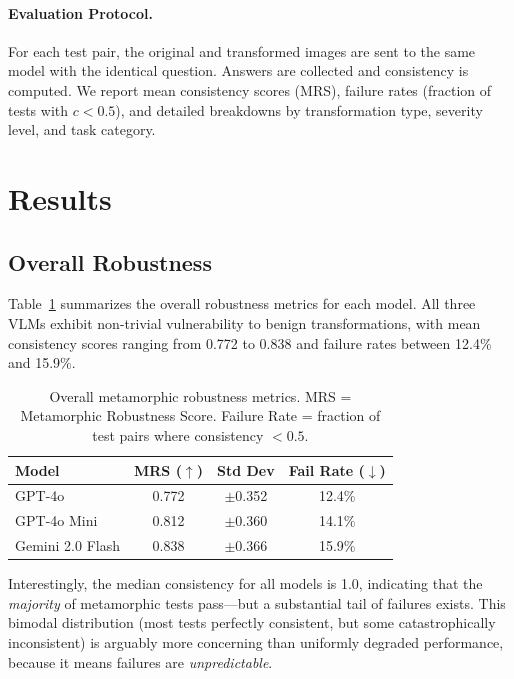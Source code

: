\documentclass[10pt,twocolumn,letterpaper]{article}
\begin{document}
\paragraph{Evaluation Protocol.} For each test pair, the original and transformed images are sent to the same model with the identical question. Answers are collected and consistency is computed. We report mean consistency scores (MRS), failure rates (fraction of tests with $c < 0.5$), and detailed breakdowns by transformation type, severity level, and task category.

\section{Results}
\label{sec:results}

\subsection{Overall Robustness}

Table~\ref{tab:overall} summarizes the overall robustness metrics for each model. All three VLMs exhibit non-trivial vulnerability to benign transformations, with mean consistency scores ranging from 0.772 to 0.838 and failure rates between 12.4\% and 15.9\%.

\begin{table}[t]
\centering
\caption{Overall metamorphic robustness metrics. MRS = Metamorphic Robustness Score. Failure Rate = fraction of test pairs where consistency $< 0.5$.}
\label{tab:overall}
\begin{tabular}{lccc}
\toprule
\textbf{Model} & \textbf{MRS} ($\uparrow$) & \textbf{Std Dev} & \textbf{Fail Rate} ($\downarrow$) \\
\midrule
GPT-4o & 0.772 & $\pm$0.352 & 12.4\% \\
GPT-4o Mini & 0.812 & $\pm$0.360 & 14.1\% \\
Gemini 2.0 Flash & 0.838 & $\pm$0.366 & 15.9\% \\
\bottomrule
\end{tabular}
\end{table}

Interestingly, the median consistency for all models is 1.0, indicating that the \emph{majority} of metamorphic tests pass---but a substantial tail of failures exists. This bimodal distribution (most tests perfectly consistent, but some catastrophically inconsistent) is arguably more concerning than uniformly degraded performance, because it means failures are \emph{unpredictable}.
\end{document}
